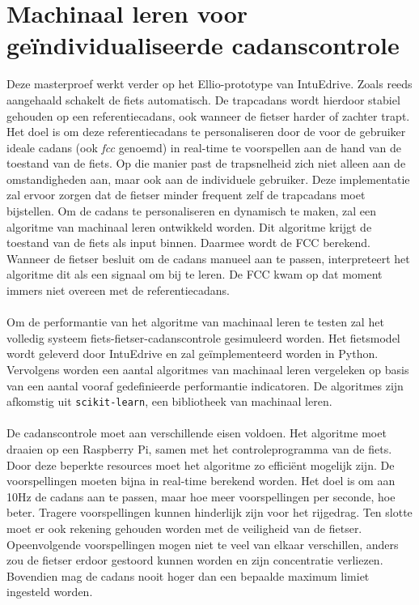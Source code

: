 \section{Machinaal leren voor geïndividualiseerde cadanscontrole}
Deze masterproef werkt verder op het Ellio-prototype van IntuEdrive. Zoals reeds aangehaald schakelt de fiets automatisch. De trapcadans wordt hierdoor stabiel gehouden op een referentiecadans, ook wanneer de fietser harder of zachter trapt. Het doel is om deze referentiecadans te personaliseren door de voor de gebruiker ideale cadans (ook \textit{\gls{fcc}} genoemd) in real-time te voorspellen aan de hand van de toestand van de fiets. Op die manier past de trapsnelheid zich niet alleen  aan de omstandigheden aan, maar ook aan de individuele gebruiker. Deze implementatie zal ervoor zorgen dat de fietser minder frequent zelf de trapcadans moet bijstellen. Om de cadans te personaliseren en dynamisch te maken, zal een algoritme van machinaal leren ontwikkeld worden. Dit algoritme krijgt de toestand van de fiets als input binnen. Daarmee wordt de FCC berekend. Wanneer de fietser besluit om de cadans manueel aan te passen, interpreteert het algoritme dit als een signaal om bij te leren. De FCC kwam op dat moment immers niet overeen met de referentiecadans.
\\\\
Om de performantie van het algoritme van machinaal leren te testen zal het volledig systeem fiets-fietser-cadanscontrole gesimuleerd worden. Het fietsmodel wordt geleverd door IntuEdrive en zal geïmplementeerd worden in Python. Vervolgens worden een aantal algoritmes van machinaal leren vergeleken op basis van een aantal vooraf gedefinieerde performantie indicatoren. De algoritmes zijn afkomstig uit \texttt{scikit-learn}, een bibliotheek van machinaal leren.
\\\\
De cadanscontrole moet aan verschillende eisen voldoen. Het algoritme moet draaien op een Raspberry Pi, samen met het controleprogramma van de fiets. Door deze beperkte resources moet het algoritme zo efficiënt mogelijk zijn. De voorspellingen moeten bijna in real-time berekend worden. Het doel is om aan 10Hz de cadans aan te passen, maar hoe meer voorspellingen per seconde, hoe beter. Tragere voorspellingen kunnen hinderlijk zijn voor het rijgedrag. Ten slotte moet er ook rekening gehouden worden met de veiligheid van de fietser. Opeenvolgende voorspellingen mogen niet te veel van elkaar verschillen, anders zou de fietser erdoor gestoord kunnen worden en zijn concentratie verliezen. Bovendien mag de cadans nooit hoger dan een bepaalde maximum limiet ingesteld worden.
